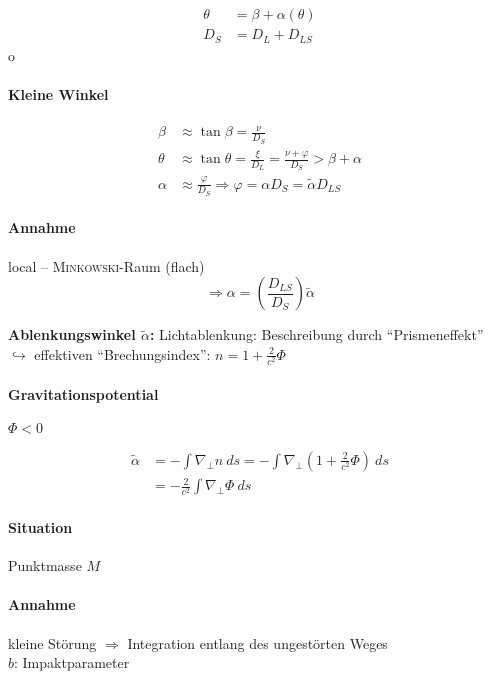 \begin{align*}
    \theta &= \beta + \alpha (\theta) \\
    D_S &= D_L + D_{LS}
\end{align*}o

\paragraph{Kleine Winkel}
\begin{align*}
    \beta &\approx \tan \beta = \frac{\nu}{D_S} \\
    \theta &\approx \tan \theta = \frac{\xi}{D_L} = \frac{\nu + \varphi}{D_S} > \beta + \alpha \\
    \alpha &\approx \frac{\varphi}{D_S} \Rightarrow \varphi = \alpha D_S = \tilde \alpha D_{LS}
\end{align*}

\paragraph{Annahme} local -- \textsc{Minkowski}-Raum (flach)
\[ \Rightarrow \boxed{\alpha = \left(\frac{D_{LS}}{D_S}\right) \tilde \alpha} \]

\begin{definition}
    \textbf{Ablenkungswinkel $\tilde \alpha$:} Lichtablenkung: Beschreibung durch
    "`Prismeneffekt"' \\
    $\hookrightarrow$ effektiven "`Brechungsindex"': $n = 1 + \frac{2}{c^2} \Phi$
\end{definition}

\paragraph{Gravitationspotential} $\Phi < 0$ 

\begin{align*}
    \tilde \alpha &= -\int \nabla_\bot n\ ds = -\int \nabla_\bot (1 + \frac{2}{c^2} \Phi)\ ds \\
                  &= -\frac{2}{c^2} \int \nabla_\bot \Phi\ ds
\end{align*}

\paragraph{Situation} Punktmasse $M$

\paragraph{Annahme} kleine Störung $\Rightarrow$ Integration entlang des ungestörten Weges \\
$b$: Impaktparameter

